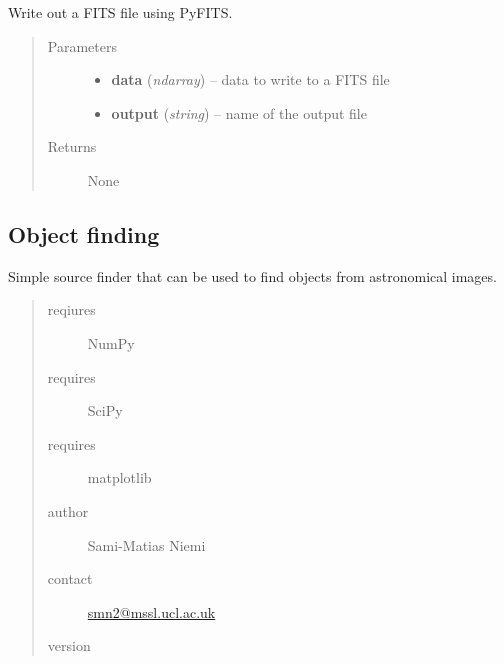 \documentclass[a4paper,12pt,english]{sphinxmanual}
\begin{document}
\begin{fulllineitems}
\begin{fulllineitems}
\label{analysis:analysis.shape.shapeMeasurement.writeFITS}
Write out a FITS file using PyFITS.
\begin{quote}\begin{description}
\item[{Parameters}] \leavevmode\begin{itemize}
\item {} 
\textbf{data} (\emph{ndarray}) -- data to write to a FITS file

\item {} 
\textbf{output} (\emph{string}) -- name of the output file

\end{itemize}

\item[{Returns}] \leavevmode
None

\end{description}\end{quote}

\end{fulllineitems}


\end{fulllineitems}

\label{analysis:module-analysis.sourceFinder}

\subsection{Object finding}
\label{analysis:object-finding}
Simple source finder that can be used to find objects from astronomical images.
\begin{quote}\begin{description}
\item[{reqiures}] \leavevmode
NumPy

\item[{requires}] \leavevmode
SciPy

\item[{requires}] \leavevmode
matplotlib

\item[{author}] \leavevmode
Sami-Matias Niemi

\item[{contact}] \leavevmode
\href{mailto:smn2@mssl.ucl.ac.uk}{smn2@mssl.ucl.ac.uk}

\item[{version}] 

\end{description}\end{quote}
\end{document}

